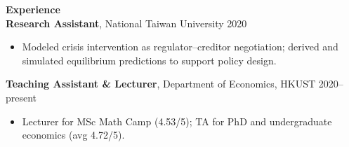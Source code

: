 \documentclass[11pt,letterpaper]{article}
\begin{document}
{\large \textbf{Experience}}\\[-0.5pt]
\textbf{Research Assistant}, National Taiwan University \hfill 2020\\
\vspace{-6pt}
\begin{itemize}
  \item Modeled crisis intervention as regulator--creditor negotiation; derived and simulated equilibrium predictions to support policy design.
\end{itemize}
\textbf{Teaching Assistant \& Lecturer}, Department of Economics, HKUST \hfill 2020--present\\
\vspace{-6pt}
\begin{itemize}
  \item Lecturer for MSc Math Camp (4.53/5); TA for PhD and undergraduate economics (avg 4.72/5).
\end{itemize}

\vspace{0.15pt}
\end{document}
